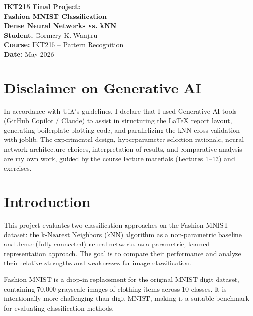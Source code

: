 \documentclass[11pt]{article}
\begin{document}
\begin{titlepage}
	\centering
	\vspace*{2cm}
	\Huge\textbf{IKT215 Final Project: \\ Fashion MNIST Classification \\ Dense Neural Networks vs. kNN} \\
	\vspace{1.5cm}
	\Large \textbf{Student:} Gormery K. Wanjiru \\
	\Large \textbf{Course:} IKT215 -- Pattern Recognition \\
	\Large \textbf{Date:} May 2026 \\
	\vfill
	\section*{Disclaimer on Generative AI}
	In accordance with UiA's guidelines, I declare that I used Generative AI tools (GitHub Copilot / Claude) to assist in structuring the LaTeX report layout, generating boilerplate plotting code, and parallelizing the kNN cross-validation with joblib. The experimental design, hyperparameter selection rationale, neural network architecture choices, interpretation of results, and comparative analysis are my own work, guided by the course lecture materials (Lectures 1--12) and exercises.
\end{titlepage}

\newpage
\section{Introduction}

This project evaluates two classification approaches on the Fashion MNIST dataset: the k-Nearest Neighbors (kNN) algorithm as a non-parametric baseline and dense (fully connected) neural networks as a parametric, learned representation approach. The goal is to compare their performance and analyze their relative strengths and weaknesses for image classification.

Fashion MNIST \cite{xiao2017} is a drop-in replacement for the original MNIST digit dataset, containing 70,000 grayscale images of clothing items across 10 classes. It is intentionally more challenging than digit MNIST, making it a suitable benchmark for evaluating classification methods.
\end{document}
